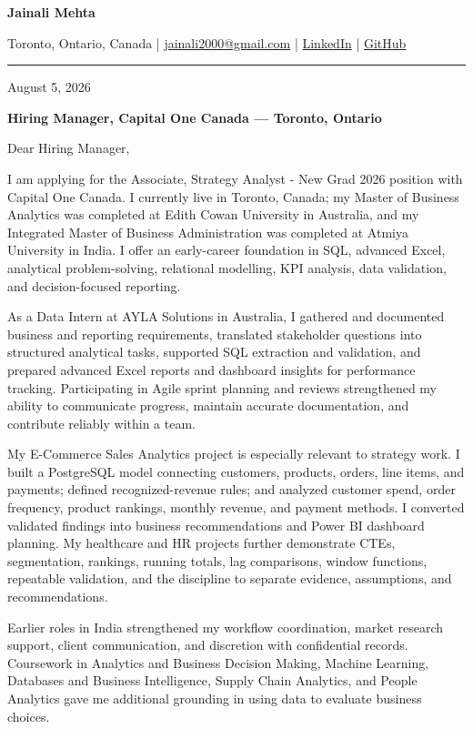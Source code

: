 \documentclass[letterpaper,10pt]{article}
\begin{document}
\begin{center}
  {\fontsize{17}{19}\selectfont\textbf{Jainali Mehta}}\par\vspace{2pt}
  \small Toronto, Ontario, Canada \;|\;
  \href{mailto:jainali2000@gmail.com}{jainali2000@gmail.com} \;|\;
  \href{https://www.linkedin.com/in/jainali-mehta}{LinkedIn} \;|\;
  \href{https://github.com/jainalimehta}{GitHub}
\end{center}
\vspace{-5pt}
\noindent\rule{\textwidth}{0.4pt}

August 5, 2026

\textbf{Hiring Manager, Capital One Canada --- Toronto, Ontario}

Dear Hiring Manager,

I am applying for the Associate, Strategy Analyst - New Grad 2026 position with Capital One Canada. I currently live in Toronto, Canada; my Master of Business Analytics was completed at Edith Cowan University in Australia, and my Integrated Master of Business Administration was completed at Atmiya University in India. I offer an early-career foundation in SQL, advanced Excel, analytical problem-solving, relational modelling, KPI analysis, data validation, and decision-focused reporting.

As a Data Intern at AYLA Solutions in Australia, I gathered and documented business and reporting requirements, translated stakeholder questions into structured analytical tasks, supported SQL extraction and validation, and prepared advanced Excel reports and dashboard insights for performance tracking. Participating in Agile sprint planning and reviews strengthened my ability to communicate progress, maintain accurate documentation, and contribute reliably within a team.

My E-Commerce Sales Analytics project is especially relevant to strategy work. I built a PostgreSQL model connecting customers, products, orders, line items, and payments; defined recognized-revenue rules; and analyzed customer spend, order frequency, product rankings, monthly revenue, and payment methods. I converted validated findings into business recommendations and Power BI dashboard planning. My healthcare and HR projects further demonstrate CTEs, segmentation, rankings, running totals, lag comparisons, window functions, repeatable validation, and the discipline to separate evidence, assumptions, and recommendations.

Earlier roles in India strengthened my workflow coordination, market research support, client communication, and discretion with confidential records. Coursework in Analytics and Business Decision Making, Machine Learning, Databases and Business Intelligence, Supply Chain Analytics, and People Analytics gave me additional grounding in using data to evaluate business choices.
\end{document}
